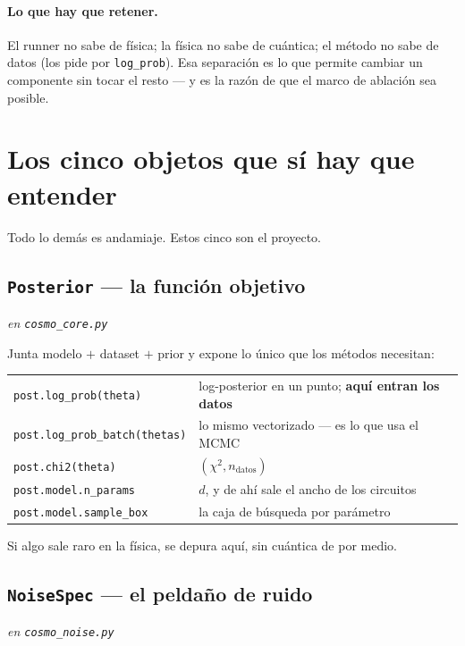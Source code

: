 \documentclass[11pt,a4paper]{article}
\newcommand{\M}[1]{\texttt{#1}}
\begin{document}
\paragraph{Lo que hay que retener.} El runner no sabe de física; la física
no sabe de cuántica; el método no sabe de datos (los pide por
\M{log\_prob}). Esa separación es lo que permite cambiar un componente sin
tocar el resto — y es la razón de que el marco de ablación sea posible.

\section{Los cinco objetos que sí hay que entender}

Todo lo demás es andamiaje. Estos cinco son el proyecto.

\subsection{\M{Posterior} — la función objetivo}
\emph{en \M{cosmo\_core.py}}

Junta modelo $+$ dataset $+$ prior y expone lo único que los métodos
necesitan:

\begin{center}
\small
\begin{tabular}{@{}ll@{}}
\toprule
\M{post.log\_prob(theta)} & log-posterior en un punto; \textbf{aquí entran los datos} \\
\M{post.log\_prob\_batch(thetas)} & lo mismo vectorizado — es lo que usa el MCMC \\
\M{post.chi2(theta)} & $(\chi^2, n_{\text{datos}})$ \\
\M{post.model.n\_params} & $d$, y de ahí sale el ancho de los circuitos \\
\M{post.model.sample\_box} & la caja de búsqueda por parámetro \\
\bottomrule
\end{tabular}
\end{center}

\noindent
Si algo sale raro en la física, se depura aquí, sin cuántica de por medio.

\subsection{\M{NoiseSpec} — el peldaño de ruido}
\emph{en \M{cosmo\_noise.py}}
\end{document}
